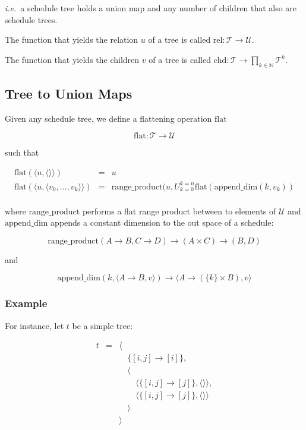 \documentclass{article}
\begin{document}
\noindent \emph{i.e.}\ a schedule tree holds a union map and any number of children that also are schedule trees.

The function that yields the relation $u$ of a tree is called $\mathrm{rel}:\mathcal{T} \rightarrow \mathcal{U}$.

The function that yields the children $v$ of a tree is called $\mathrm{chd}:\mathcal{T} \rightarrow \displaystyle\prod_{k\in\mathbb{N}}\mathcal{T}^k$.

\subsection{Tree to Union Maps}

Given any schedule tree, we define a flattening operation $\mathrm{flat}$

\[
    \mathrm{flat}: \mathcal{T} \rightarrow \mathcal{U}
\]

\noindent such that

\[
    \begin{array}{lcl}
        \mathrm{flat}(\langle u, \langle\rangle \rangle) &=& u \\
        \mathrm{flat}(\langle u, \langle v_0, \ldots, v_k\rangle \rangle) &=& \mathrm{range\_product}(u, U_{k=0}^{k=n} \mathrm{flat}(\mathrm{append\_dim}(k, v_k)) \\
    \end{array}
\]

\noindent where $\mathrm{range\_product}$ performs a flat range product between to elements of $\mathcal{U}$ and $\mathrm{append\_dim}$ appends a constant dimension to the out space of a schedule:

\[
    \mathrm{range\_product}(A \rightarrow B, C \rightarrow D) \rightarrow (A \times C) \rightarrow (B, D)
\]

\noindent and

\[
    \mathrm{append\_dim}(k, \langle A \rightarrow B, v\rangle) \rightarrow \langle A \rightarrow (\{k\} \times B), v \rangle
\]

\subsubsection*{Example}

For instance, let $t$ be a simple tree:

\[
    \begin{array}{lcl}
        t &=& \langle \\
          & & \quad\{[i,j] \rightarrow [i] \},\\
          & & \quad\langle \\
          & & \quad\quad \langle\{ [i,j] \rightarrow [j] \}, \langle\rangle\rangle,\\
          & & \quad\quad \langle\{ [i,j] \rightarrow [j] \}, \langle\rangle\rangle\\
          & & \quad\rangle \\
          & & \rangle \\
    \end{array}
\]
\end{document}

